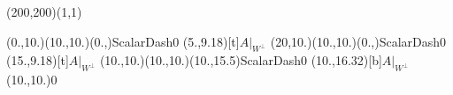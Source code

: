 \unitlength=1bp%

\begin{feynartspicture}(200,200)(1,1)

\FADiagram{}
\FAProp(0.,10.)(10.,10.)(0.,){ScalarDash}{0}
\FALabel(5.,9.18)[t]{$A|_{W^\perp}$}
\FAProp(20,10.)(10.,10.)(0.,){ScalarDash}{0}
\FALabel(15.,9.18)[t]{$A|_{W^\perp}$}
\FAProp(10.,10.)(10.,10.)(10.,15.5){ScalarDash}{0}
\FALabel(10.,16.32)[b]{$A|_{W^\perp}$}
\FAVert(10.,10.){0}
\end{feynartspicture}

